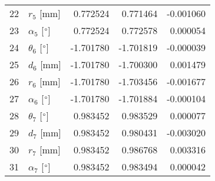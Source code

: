 \documentclass{standalone}%
\begin{document}
\begin{tabular}{llrrr}
22 &              $r_{5}$ [mm] &  0.772524 &   0.771464 &  -0.001060 \\
23 &  $\alpha_{5}$ [$\degree$] &  0.772524 &   0.772578 &   0.000054 \\
24 &  $\theta_{6}$ [$\degree$] & -1.701780 &  -1.701819 &  -0.000039 \\
25 &              $d_{6}$ [mm] & -1.701780 &  -1.700300 &   0.001479 \\
26 &              $r_{6}$ [mm] & -1.701780 &  -1.703456 &  -0.001677 \\
27 &  $\alpha_{6}$ [$\degree$] & -1.701780 &  -1.701884 &  -0.000104 \\
28 &  $\theta_{7}$ [$\degree$] &  0.983452 &   0.983529 &   0.000077 \\
29 &              $d_{7}$ [mm] &  0.983452 &   0.980431 &  -0.003020 \\
30 &              $r_{7}$ [mm] &  0.983452 &   0.986768 &   0.003316 \\
31 &  $\alpha_{7}$ [$\degree$] &  0.983452 &   0.983494 &   0.000042 \\
\bottomrule
\end{tabular}
%
\end{document}
